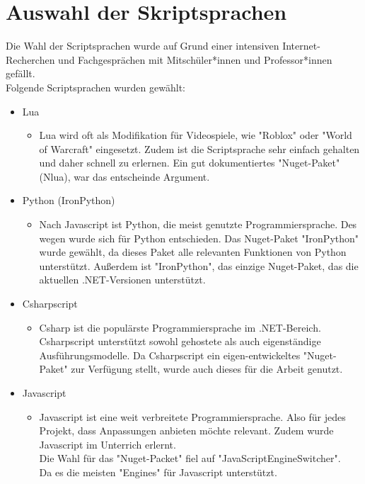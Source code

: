 \section{Auswahl der Skriptsprachen}

Die Wahl der Scriptsprachen wurde auf Grund einer intensiven Internet-Recherchen 
und Fachgesprächen mit Mitschüler*innen und Professor*innen gefällt.\\
Folgende Scriptsprachen wurden gewählt:

\begin{itemize}
    \item Lua
    \begin{itemize}
        \item Lua wird oft als Modifikation für Videospiele, wie "Roblox" oder "World of Warcraft" eingesetzt.
        Zudem ist die Scriptsprache sehr einfach gehalten und daher schnell zu erlernen. 
        Ein gut dokumentiertes "Nuget-Paket" (Nlua), war das entscheinde Argument.
    \end{itemize}
    \item Python (IronPython)
    \begin{itemize}
        \item Nach Javascript ist Python, die meist genutzte Programmiersprache. Des wegen wurde sich für Python entschieden.
        Das Nuget-Paket "IronPython" wurde gewählt, da dieses Paket alle relevanten Funktionen von Python unterstützt.
        Außerdem ist "IronPython", das einzige Nuget-Paket, das die aktuellen .NET-Versionen unterstützt.
    \end{itemize}
    \item Csharpscript
    \begin{itemize}
        \item Csharp ist die populärste Programmiersprache im .NET-Bereich. Csharpscript unterstützt sowohl gehostete als auch eigenständige Ausführungsmodelle.
        Da Csharpscript ein eigen-entwickeltes "Nuget-Paket" zur Verfügung stellt, wurde auch dieses für die Arbeit genutzt.
    \end{itemize}
    \item Javascript
    \begin{itemize}
        \item Javascript ist eine weit verbreitete Programmiersprache. Also für jedes Projekt, dass Anpassungen anbieten möchte relevant.
        Zudem wurde Javascript im Unterrich erlernt.\\
        Die Wahl für das "Nuget-Packet" fiel auf "JavaScriptEngineSwitcher". \\ 
        Da es die meisten "Engines" für Javascript unterstützt.
    \end{itemize}
\end{itemize}

